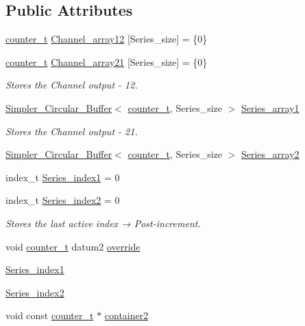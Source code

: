 \subsection*{Public Attributes}
\begin{DoxyCompactItemize}
\item 
\hyperlink{types_8hpp_ac89ac912f524b3e3fa3720ea55fec966}{counter\+\_\+t} \hyperlink{classLin__CrossCorr__RT__Teensy_ad1a3471c7cbcee3bd9b800571cd2ae3d}{Channel\+\_\+array12} \mbox{[}Series\+\_\+size\mbox{]} = \{0\}
\item 
\hyperlink{types_8hpp_ac89ac912f524b3e3fa3720ea55fec966}{counter\+\_\+t} \hyperlink{classLin__CrossCorr__RT__Teensy_a03a339977779908684cba60c8d3f9738}{Channel\+\_\+array21} \mbox{[}Series\+\_\+size\mbox{]} = \{0\}
\begin{DoxyCompactList}\small\item\em Stores the Channel output -\/ 12. \end{DoxyCompactList}\item 
\hyperlink{classSimpler__Circular__Buffer}{Simpler\+\_\+\+Circular\+\_\+\+Buffer}$<$ \hyperlink{types_8hpp_ac89ac912f524b3e3fa3720ea55fec966}{counter\+\_\+t}, Series\+\_\+size $>$ \hyperlink{classLin__CrossCorr__RT__Teensy_a13307ad04080703e9ef8c0cd9794a6b0}{Series\+\_\+array1}
\begin{DoxyCompactList}\small\item\em Stores the Channel output -\/ 21. \end{DoxyCompactList}\item 
\hyperlink{classSimpler__Circular__Buffer}{Simpler\+\_\+\+Circular\+\_\+\+Buffer}$<$ \hyperlink{types_8hpp_ac89ac912f524b3e3fa3720ea55fec966}{counter\+\_\+t}, Series\+\_\+size $>$ \hyperlink{classLin__CrossCorr__RT__Teensy_a509bcfdab5a3239a014f5805c388172a}{Series\+\_\+array2}
\item 
index\+\_\+t \hyperlink{classLin__CrossCorr__RT__Teensy_afcf9512277d8bd2183ae44b8da1096df}{Series\+\_\+index1} = 0
\item 
index\+\_\+t \hyperlink{classLin__CrossCorr__RT__Teensy_a945eda00978a28dd536e58e225821af6}{Series\+\_\+index2} = 0
\begin{DoxyCompactList}\small\item\em Stores the last active index → Post-\/increment. \end{DoxyCompactList}\item 
void \hyperlink{types_8hpp_ac89ac912f524b3e3fa3720ea55fec966}{counter\+\_\+t} datum2 \hyperlink{classLin__CrossCorr__RT__Teensy_a5baab98aab70338799de9f82e7c7cc06}{override}
\item 
\hyperlink{classLin__CrossCorr__RT__Teensy_abefa188b0d61b97e915849fa8d11cc9f}{Series\+\_\+index1}
\item 
\hyperlink{classLin__CrossCorr__RT__Teensy_a4f84a456a7d6e90e8676e4c5ed059776}{Series\+\_\+index2}
\item 
void const \hyperlink{types_8hpp_ac89ac912f524b3e3fa3720ea55fec966}{counter\+\_\+t} $\ast$ \hyperlink{classLin__CrossCorr__RT__Teensy_a9c49e09d3817e1f1344c51928e3afb57}{container2}
\end{DoxyCompactItemize}


